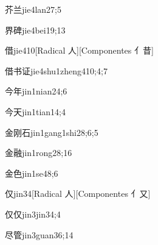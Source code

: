 \begin{verbete}{芥兰}{jie4lan2}{7;5}
\end{verbete}

\begin{verbete}{界碑}{jie4bei1}{9;13}
\end{verbete}

\begin{verbete}{借}{jie4}{10}[Radical 人][Componentes 亻昔]
\end{verbete}

\begin{verbete}{借书证}{jie4shu1zheng4}{10;4;7}
\end{verbete}

\begin{verbete}{今年}{jin1nian2}{4;6}
\end{verbete}

\begin{verbete}{今天}{jin1tian1}{4;4}
\end{verbete}

\begin{verbete}{金刚石}{jin1gang1shi2}{8;6;5}
\end{verbete}

\begin{verbete}{金融}{jin1rong2}{8;16}
\end{verbete}

\begin{verbete}{金色}{jin1se4}{8;6}
\end{verbete}

\begin{verbete}{仅}{jin3}{4}[Radical 人][Componentes 亻又]
\end{verbete}

\begin{verbete}{仅仅}{jin3jin3}{4;4}
\end{verbete}

\begin{verbete}{尽管}{jin3guan3}{6;14}
\end{verbete}

